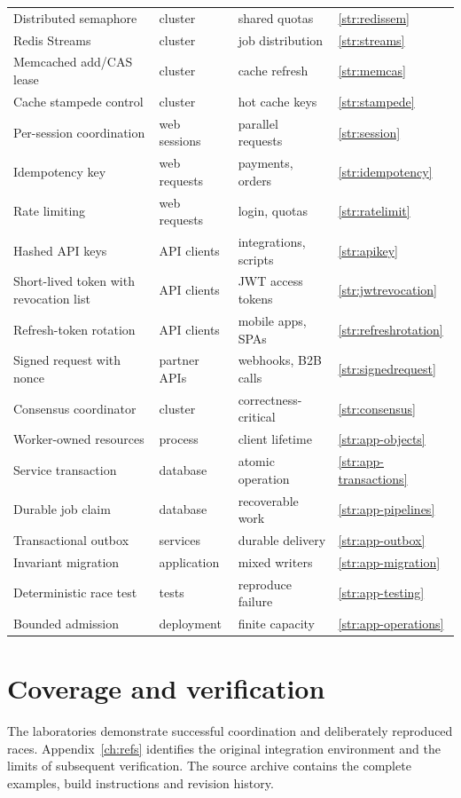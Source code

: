 \documentclass[11pt,openany]{book}
\begin{document}
\begin{longtable}{L{.30\linewidth}L{.24\linewidth}L{.24\linewidth}L{.10\linewidth}}
Distributed semaphore & cluster & shared quotas & \ref{str:redissem} \\
Redis Streams & cluster & job distribution & \ref{str:streams} \\
Memcached add/CAS lease & cluster & cache refresh & \ref{str:memcas} \\
Cache stampede control & cluster & hot cache keys & \ref{str:stampede} \\
Per-session coordination & web sessions & parallel requests & \ref{str:session} \\
Idempotency key & web requests & payments, orders & \ref{str:idempotency} \\
Rate limiting & web requests & login, quotas & \ref{str:ratelimit} \\
Hashed API keys & API clients & integrations, scripts & \ref{str:apikey} \\
Short-lived token with revocation list & API clients & JWT access tokens & \ref{str:jwtrevocation} \\
Refresh-token rotation & API clients & mobile apps, SPAs & \ref{str:refreshrotation} \\
Signed request with nonce & partner APIs & webhooks, B2B calls & \ref{str:signedrequest} \\
Consensus coordinator & cluster & correctness-critical & \ref{str:consensus} \\
Worker-owned resources & process & client lifetime & \ref{str:app-objects}\\
Service transaction & database & atomic operation & \ref{str:app-transactions}\\
Durable job claim & database & recoverable work & \ref{str:app-pipelines}\\
Transactional outbox & services & durable delivery & \ref{str:app-outbox}\\
Invariant migration & application & mixed writers & \ref{str:app-migration}\\
Deterministic race test & tests & reproduce failure & \ref{str:app-testing}\\
Bounded admission & deployment & finite capacity & \ref{str:app-operations}\\
\bottomrule\end{longtable}

\endgroup
{}\section*{Coverage and verification}
The laboratories demonstrate successful coordination and deliberately reproduced races. Appendix~\ref{ch:refs} identifies the original integration environment and the limits of subsequent verification. The source archive contains the complete examples, build instructions and revision history.
\end{document}
